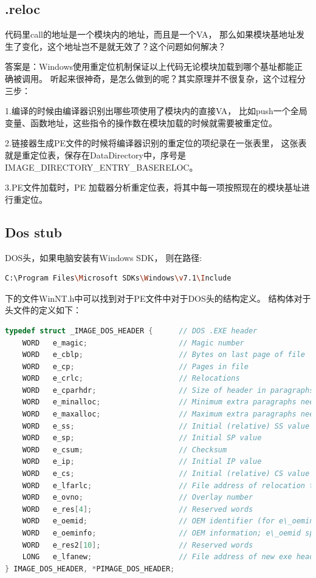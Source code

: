 \documentclass{book}
\begin{document}
\subsection{.reloc}

代码里call的地址是一个模块内的地址，而且是一个VA，
那么如果模块基地址发生了变化，这个地址岂不是就无效了？这个问题如何解决？

答案是：Windows使用重定位机制保证以上代码无论模块加载到哪个基址都能正确被调用。
听起来很神奇，是怎么做到的呢？其实原理并不很复杂，这个过程分三步：

1.编译的时候由编译器识别出哪些项使用了模块内的直接VA，
比如push一个全局变量、函数地址，这些指令的操作数在模块加载的时候就需要被重定位。

2.链接器生成PE文件的时候将编译器识别的重定位的项纪录在一张表里，
这张表就是重定位表，保存在DataDirectory中，序号是 IMAGE\_DIRECTORY\_ENTRY\_BASERELOC。

3.PE文件加载时，PE 加载器分析重定位表，将其中每一项按照现在的模块基址进行重定位。

\subsection{Dos stub}DOS头，如果电脑安装有Windows SDK，
则在路径:

\begin{lstlisting}[language=Bash]
C:\Program Files\Microsoft SDKs\Windows\v7.1\Include
\end{lstlisting}

下的文件WinNT.h中可以找到对于PE文件中对于DOS头的结构定义。
结构体对于头文件的定义如下：

\begin{lstlisting}[language=C]
typedef struct _IMAGE_DOS_HEADER {      // DOS .EXE header
	WORD   e_magic;                     // Magic number
	WORD   e_cblp;                      // Bytes on last page of file
	WORD   e_cp;                        // Pages in file
	WORD   e_crlc;                      // Relocations
	WORD   e_cparhdr;                   // Size of header in paragraphs
	WORD   e_minalloc;                  // Minimum extra paragraphs needed
	WORD   e_maxalloc;                  // Maximum extra paragraphs needed
	WORD   e_ss;                        // Initial (relative) SS value
	WORD   e_sp;                        // Initial SP value
	WORD   e_csum;                      // Checksum
	WORD   e_ip;                        // Initial IP value
	WORD   e_cs;                        // Initial (relative) CS value
	WORD   e_lfarlc;                    // File address of relocation table
	WORD   e_ovno;                      // Overlay number
	WORD   e_res[4];                    // Reserved words
	WORD   e_oemid;                     // OEM identifier (for e\_oeminfo)
	WORD   e_oeminfo;                   // OEM information; e\_oemid specific
	WORD   e_res2[10];                  // Reserved words
	LONG   e_lfanew;                    // File address of new exe header
} IMAGE_DOS_HEADER, *PIMAGE_DOS_HEADER;
\end{lstlisting}
\end{document}
